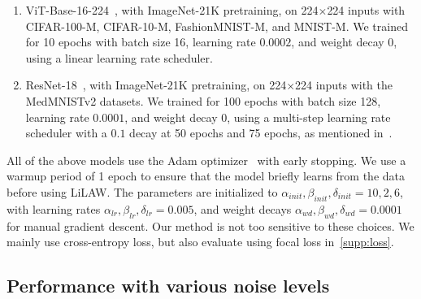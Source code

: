 \documentclass{article}
\theoremstyle{plain}
\theoremstyle{definition}
\theoremstyle{remark}
\begin{document}
\begin{enumerate}[leftmargin=*,labelindent=0pt,label=\textbf{--}]
    \itemsep-0.2em
    \item ViT-Base-16-224~\citep{vit}, with ImageNet-21K pretraining, on 224$\times$224 inputs with CIFAR-100-M, CIFAR-10-M, FashionMNIST-M, and MNIST-M. We trained for 10 epochs with batch size 16, learning rate $0.0002$, and weight decay $0$, using a linear learning rate scheduler. 
    \item ResNet-18~\citep{resnet}, with ImageNet-21K pretraining, on 224$\times$224 inputs with the MedMNISTv2 datasets. We trained for 100 epochs with batch size 128, learning rate $0.0001$, and weight decay $0$, using a multi-step learning rate scheduler with a $0.1$ decay at 50 epochs and 75 epochs, as mentioned in~\citet{medmnistv2}.
\end{enumerate}
\vspace{-1em}
All of the above models use the Adam optimizer~\citep{kingma2014adam} with early stopping. We use a warmup period of 1 epoch to ensure that the model briefly learns from the data before using LiLAW. The parameters are initialized to $\alpha_{init}, \beta_{init}, \delta_{init} = 10, 2, 6$, with learning rates $\alpha_{lr}, \beta_{lr}, \delta_{lr} = 0.005$, and weight decays $\alpha_{wd}, \beta_{wd}, \delta_{wd} = 0.0001$ for manual gradient descent. Our method is not too sensitive to these choices. We mainly use cross-entropy loss, but also evaluate using focal loss in~\ref{supp:loss}.


\subsection{Performance with various noise levels}
\label{supp:noiselevel}
\end{document}
